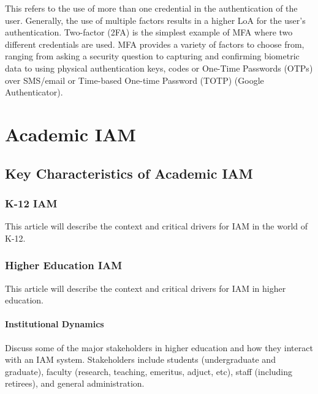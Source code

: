This refers to the use of more than one credential in the authentication
of the user. Generally, the use of multiple factors results in a higher
LoA for the user's authentication. Two-factor (2FA) is the simplest
example of MFA where two different credentials are used. MFA provides a
variety of factors to choose from, ranging from asking a security
question to capturing and confirming biometric data to using physical
authentication keys, codes or One-Time Passwords (OTPs) over SMS/email
or Time-based One-time Password (TOTP) (Google Authenticator).~

\hypertarget{academic-iam}{%
\chapter{Academic IAM}\label{academic-iam}}

\hypertarget{key-characteristics-of-academic-iam}{%
\section{Key Characteristics of Academic
IAM}\label{key-characteristics-of-academic-iam}}

\hypertarget{k-12-iam}{%
\subsection{K-12 IAM}\label{k-12-iam}}

This article will describe the context and critical drivers for IAM in
the world of K-12.

\hypertarget{higher-education-iam}{%
\subsection{Higher Education IAM}\label{higher-education-iam}}

This article will describe the context and critical drivers for IAM in
higher education.

\hypertarget{institutional-dynamics}{%
\subsubsection{Institutional Dynamics}\label{institutional-dynamics}}

Discuss some of the major stakeholders in higher education and how they
interact with an IAM system. Stakeholders include students
(undergraduate and graduate), faculty (research, teaching, emeritus,
adjuct, etc), staff (including retirees), and general administration.

